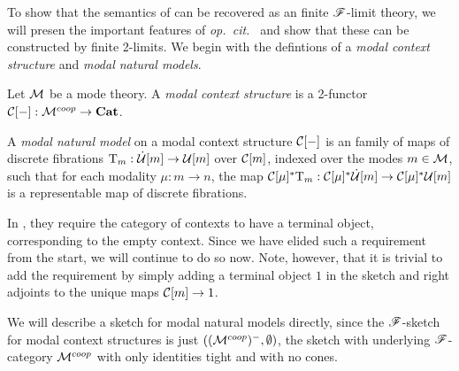 \documentclass[../thesis.tex]{subfiles}
\begin{document}
To show that the semantics of \cite[{§5}]{gratzer2021} can be recovered as an finite ${\mathscr{F}}$-limit theory, we will
presen the important features of \emph{op.\ cit.\ } and show that these can be constructed by finite 2-limits. We
begin with the defintions of a \emph{modal context structure} and \emph{modal natural models}.
\begin{definition}
  Let ${\mathcal{M}}$ be a mode theory. A \emph{modal context structure} is a 2-functor ${\mathcal{C}}[-] : {\mathcal{M}}^{coop} \to {\mathbf{Cat}}$. 

  A \emph{modal natural model} on a modal context structure ${\mathcal{C}}[-]$ is an family of maps of discrete fibrations
  ${{\mathrm{T}}}_m : \dot{{\mathcal{U}}}[m] \to {\mathcal{U}}[m]$ over ${\mathcal{C}}[m]$, indexed over the modes $m \in {\mathcal{M}}$, such that for each modality
  $\mu : m \to n$, the map ${\mathcal{C}}[\mu]^*{{\mathrm{T}}}_m : {\mathcal{C}}[\mu]^*\dot{{\mathcal{U}}}[m] \to {\mathcal{C}}[\mu]^*{\mathcal{U}}[m]$ is a representable map of
  discrete fibrations.
\end{definition}
\begin{remark}
  In \cite{gratzer2021}, they require the category of contexts to have a terminal object, corresponding to the empty
  context. Since we have elided such a requirement from the start, we will continue to do so now. Note, however, that
  it is trivial to add the requirement by simply adding a terminal object $1$ in the sketch and right adjoints to the
  unique maps ${\mathcal{C}}[m] \to 1$.
\end{remark}
We will describe a sketch for modal natural models directly, since the ${\mathscr{F}}$-sketch for modal context structures is
just $(({\mathcal{M}}^{coop})^-, \emptyset)$, the sketch with underlying ${\mathscr{F}}$-category ${\mathcal{M}}^{coop}$ with only identities tight
and with no cones. 
\end{document}
